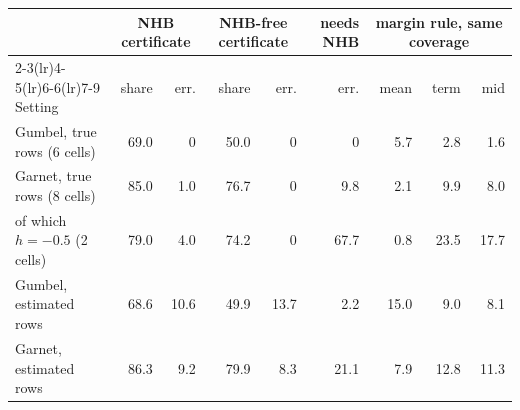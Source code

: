 \setlength{\tabcolsep}{3.5pt}%
\begin{tabular}{lrrrrrrrr}
\toprule
 & \multicolumn{2}{c}{NHB certificate} & \multicolumn{2}{c}{NHB-free certificate} & needs NHB & \multicolumn{3}{c}{margin rule, same coverage} \\
\cmidrule(lr){2-3}\cmidrule(lr){4-5}\cmidrule(lr){6-6}\cmidrule(lr){7-9}
Setting & share & err. & share & err. & err. & mean & term & mid \\
\midrule
Gumbel, true rows (6 cells) & 69.0 & 0 & 50.0 & 0 & 0 & 5.7 & 2.8 & 1.6 \\
Garnet, true rows (8 cells) & 85.0 & 1.0 & 76.7 & 0 & 9.8 & 2.1 & 9.9 & 8.0 \\
\quad of which $h{=}{-}0.5$ (2 cells) & 79.0 & 4.0 & 74.2 & 0 & 67.7 & 0.8 & 23.5 & 17.7 \\
\midrule
Gumbel, estimated rows & 68.6 & 10.6 & 49.9 & 13.7 & 2.2 & 15.0 & 9.0 & 8.1 \\
Garnet, estimated rows & 86.3 & 9.2 & 79.9 & 8.3 & 21.1 & 7.9 & 12.8 & 11.3 \\
\bottomrule
\end{tabular}
